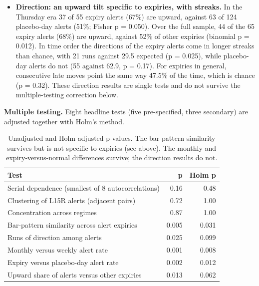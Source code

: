 \documentclass[10pt,a4paper]{article}
\begin{document}
\begin{itemize}
\item \textbf{Direction: an upward tilt specific to expiries, with streaks.} In the Thursday era 37 of 55 expiry alerts (67\%) are upward, against 63 of 124 placebo-day alerts (51\%; Fisher p = 0.050). Over the full sample, 44 of the 65 expiry alerts (68\%) are upward, against 52\% of other expiries (binomial p = 0.012). In time order the directions of the expiry alerts come in longer streaks than chance, with 21 runs against 29.5 expected (p = 0.025), while placebo-day alerts do not (55 against 62.9, p = 0.17). For expiries in general, consecutive late moves point the same way 47.5\% of the time, which is chance (p = 0.32). These direction results are single tests and do not survive the multiple-testing correction below.
\end{itemize}

\textbf{Multiple testing.} Eight headline tests (five pre-specified, three secondary) are adjusted together with Holm's method.
\begin{table}[h!]\centering\small
\begin{tabular}{lrr}
\toprule
Test & p & Holm p\\
\midrule
Serial dependence (smallest of 8 autocorrelations) & 0.16 & 0.48\\
Clustering of L15R alerts (adjacent pairs) & 0.72 & 1.00\\
Concentration across regimes & 0.87 & 1.00\\
Bar-pattern similarity across alert expiries & 0.005 & 0.031\\
Runs of direction among alerts & 0.025 & 0.099\\
Monthly versus weekly alert rate & 0.001 & 0.008\\
Expiry versus placebo-day alert rate & 0.002 & 0.012\\
Upward share of alerts versus other expiries & 0.013 & 0.062\\
\bottomrule
\end{tabular}
\caption{Unadjusted and Holm-adjusted p-values. The bar-pattern similarity survives but is not specific to expiries (see above). The monthly and expiry-versus-normal differences survive; the direction results do not.}
\end{table}
\end{document}
